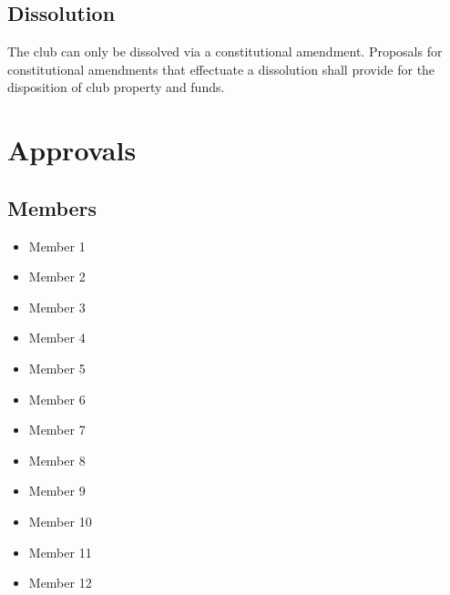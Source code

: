 \documentclass{article}
\begin{document}
\subsection{Dissolution}

The club can only be dissolved via a constitutional amendment. Proposals for
constitutional amendments that effectuate a dissolution shall provide for the
disposition of club property and funds.

\newpage

\section*{Approvals}

\vspace{4ex}

\subsection*{Members}

\begin{minipage}{0.3\textwidth}
    \begin{itemize}
        \item Member 1
        \item Member 2
        \item Member 3
        \item Member 4
    \end{itemize}
\end{minipage}
\hfill
\begin{minipage}{0.3\textwidth}
    \begin{itemize}
        \item Member 5
        \item Member 6
        \item Member 7
        \item Member 8
    \end{itemize}
\end{minipage}
\hfill
\begin{minipage}{0.3\textwidth}
    \begin{itemize}
        \item Member 9
        \item Member 10
        \item Member 11
        \item Member 12
    \end{itemize}
\end{minipage}
\end{document}
